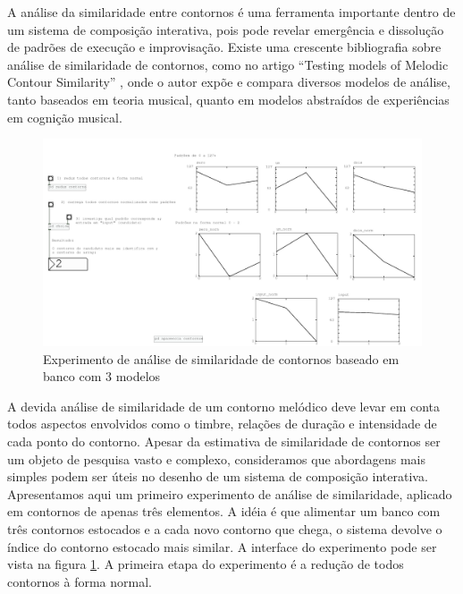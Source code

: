 \documentclass{ppgmus}
\begin{document}
A análise da similaridade entre contornos é uma ferramenta importante dentro
 de um sistema de composição interativa, pois pode revelar emergência e dissolução de 
padrões de execução e improvisação. 
Existe uma crescente bibliografia sobre análise de similaridade de contornos,
como no artigo ``Testing models of Melodic Contour Similarity'' \cite{schmuckler}, onde o autor expõe e compara diversos modelos de análise,
tanto baseados em teoria musical, quanto em modelos abstraídos de experiências
em cognição musical.

\begin{figure}
\includegraphics[scale=.4]{similaridade-interface}
\caption{Experimento de análise de similaridade de contornos baseado em banco com 3 modelos}
\label{similaridade-interface}
\end{figure}

A devida análise de similaridade de um contorno melódico deve levar em conta todos
aspectos envolvidos como o timbre, relações de duração e intensidade de cada ponto do contorno.
Apesar da estimativa de similaridade de contornos ser um objeto de pesquisa vasto e complexo, 
consideramos que abordagens
mais simples podem ser úteis no desenho de um sistema de composição interativa.
Apresentamos aqui um primeiro experimento de análise de similaridade, aplicado em
contornos de apenas três elementos. A idéia é que alimentar um banco com três contornos estocados e a cada
novo contorno que chega, o sistema devolve o índice do contorno estocado mais similar.
A interface do experimento pode ser vista na figura \ref{similaridade-interface}.
A primeira etapa do experimento é a redução de todos contornos à forma normal.
\end{document}
